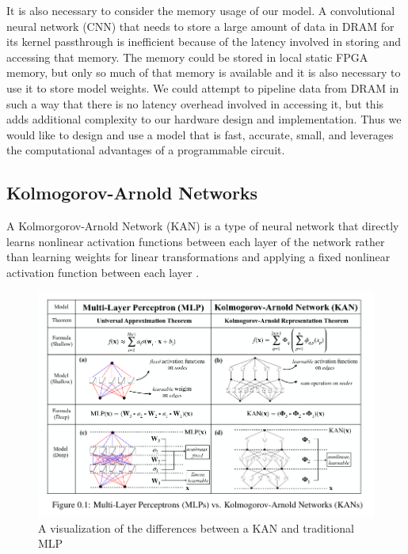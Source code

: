 \documentclass{article}
\newcommand{\mycomment}[1]{}
\begin{document}
It is also necessary to consider the memory usage of our model. A convolutional neural network (CNN) that needs to store a large amount of data in DRAM for its kernel passthrough is inefficient because of the latency involved in storing and accessing that memory. The memory could be stored in local static FPGA memory\mycomment{what is a better name for this?}, but only so much of that memory is available and it is also necessary to use it to store model weights. We could attempt to pipeline data from DRAM in such a way that there is no latency overhead involved in accessing it, but this adds additional complexity to our hardware design and implementation. Thus we would like to design and use a model that is fast, accurate, small, and leverages the computational advantages of a programmable circuit.

\subsection{Kolmogorov-Arnold Networks}
A Kolmorgorov-Arnold Network (KAN) is a type of neural network that directly learns nonlinear activation functions between each layer of the network rather than learning weights for linear transformations and applying a fixed nonlinear activation function between each layer \cite{kan}.

\begin{figure}[H]
\centering
\includegraphics[scale=0.5]{mlpkan.png}
\caption{A visualization of the differences between a KAN and traditional MLP \cite{kan}}
\end{figure}
\end{document}
